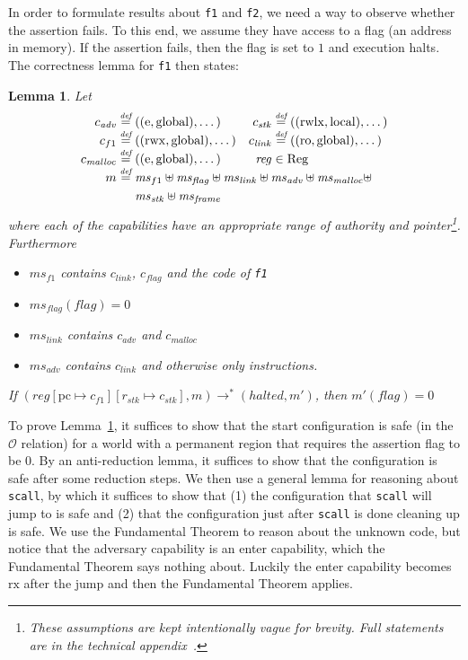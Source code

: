 \documentclass[compsoc,conference,letterpaper,fleqn]{IEEEtran}
\newtheorem{lemma}{Lemma}
\newcommand{\update}[2]{[#1 \mapsto #2]}
\newcommand{\defeq}{\stackrel{\textit{\tiny{def}}}{=}}
\newcommand{\var}[1]{\mathit{#1}}
\newcommand{\hs}{\var{ms}}
\newcommand{\ms}{\hs}
\newcommand{\pcreg}{\mathrm{pc}}
\newcommand{\reg}{\var{reg}}
\newcommand{\adv}{\var{adv}}
\newcommand{\link}{\var{link}}
\newcommand{\stk}{\var{stk}}
\newcommand{\flag}{\var{flag}}
\newcommand{\halted}{\mathit{halted}}
\newcommand{\codelabel}[1]{\mathit{#1}}
\newcommand{\malloc}{\codelabel{malloc}}
\newcommand{\plaindom}[1]{\mathrm{#1}}
\newcommand{\Regs}{\plaindom{Reg}}
\newcommand{\observations}{\mathcal{O}}
\newcommand{\plainperm}[1]{\mathrm{#1}}
\newcommand{\readonly}{\plainperm{ro}}
\newcommand{\exec}{\plainperm{rx}}
\newcommand{\entry}{\plainperm{e}}
\newcommand{\rwx}{\plainperm{rwx}}
\newcommand{\rwlx}{\plainperm{rwlx}}
\newcommand{\local}{\plainperm{local}}
\newcommand{\glob}{\plainperm{global}}
\newcommand{\step}[1][]{\rightarrow_{#1}}
\begin{document}
In order to formulate results about \texttt{\footnotesize{f1}} and
\texttt{\footnotesize{f2}}, we need a way to observe whether the assertion
fails. To this end, we assume they have access to a flag (an address in memory).
If the assertion fails, then the flag is set to $1$ and execution halts. The correctness lemma
for \texttt{\footnotesize{f1}} then states:
\begin{lemma}
  \label{lem:correctness-f1}
  Let
\[
    \begin{array}{r@{}lr@{}l}
    c_\adv & \;\defeq ((\entry,\glob),\dots) & c_{\var{stk}} & \;\defeq ((\rwlx,\local),\dots)\\
    c_{f1} & \;\defeq ((\rwx,\glob),\dots) & c_\link &\; \defeq ((\readonly,\glob),\dots)\\
    c_\malloc &\; \defeq ((\entry,\glob),\dots) & \reg& \; \in \Regs \\
    m &  \multicolumn{3}{@{}l}{\;\defeq \ms_{f1} \uplus \ms_\flag \uplus \ms_{\var{link}} \uplus \hs_\adv \uplus \ms_{\malloc} \uplus} \\
      & \multicolumn{3}{@{}l}{\phantom{\;\defeq \;}  \ms_{\var{stk}} \uplus \ms_{\var{frame}}} \\
    \end{array}
\]
where each of the capabilities have an appropriate range of authority and
pointer\footnote{These assumptions are kept intentionally vague for brevity.
  Full statements are in the technical appendix~\citep{technical_appendix}.}.
Furthermore
  \begin{itemize}
  \item $\ms_{f1}$ contains $c_\link$, $c_\flag$ and the code of \texttt{\footnotesize{f1}}
  \item $\ms_\flag(\flag) = 0$
  \item $\ms_{\var{link}}$ contains $c_\adv$ and $c_\malloc$
  \item $\hs_\adv$ contains $c_\link$ and otherwise only instructions.
  \end{itemize}
  If $(\reg\update{\pcreg}{c_{f1}}\update{r_\stk}{c_\stk},m) \step^* (\halted,m')$,
  then $m'(\flag) = 0$
\end{lemma}

To prove Lemma~\ref{lem:correctness-f1}, it suffices to show that the start
configuration is safe (in the $\observations$ relation) for a world with a
permanent region that requires the assertion flag to be 0. By an anti-reduction
lemma, it suffices to show that the configuration is safe after some reduction
steps. We then use a general lemma for reasoning about
\texttt{\footnotesize{scall}}, by which it suffices to show that (1) the
configuration that \texttt{\footnotesize{scall}} will jump to is safe and (2)
that the configuration just after \texttt{\footnotesize{scall}} is done cleaning
up is safe. We use the Fundamental Theorem to reason about the unknown code, but
notice that the adversary capability is an enter capability, which the
Fundamental Theorem says nothing about. Luckily the enter capability becomes
$\exec$ after the jump and then the Fundamental Theorem applies.
\end{document}
